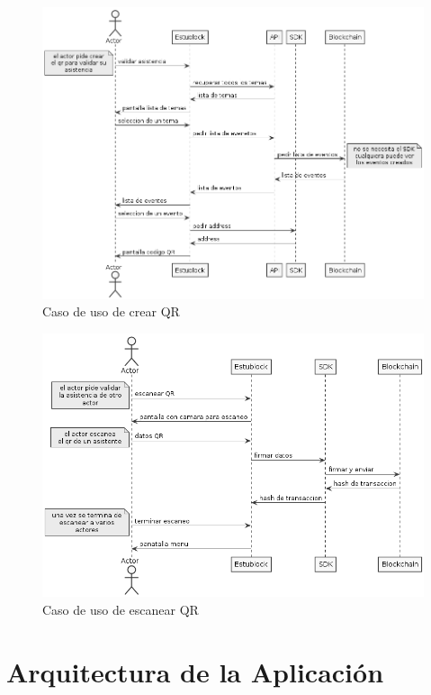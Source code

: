 \begin{figure}[h!]
  \centering
  \includegraphics[width=1\linewidth]{figs/Desarrollo/CasosUso/crearQR}
  \caption[Caso de uso de crear QR]{Caso de uso de crear QR}
  \label{fig:casoCrearQR}
\end{figure}

\begin{figure}[h!]
  \centering
  \includegraphics[width=1\linewidth]{figs/Desarrollo/CasosUso/escanearQR}
  \caption[Caso de uso de escanear QR]{Caso de uso de escanear QR}
  \label{fig:casoEscanearQR}
\end{figure}


\clearpage
\section{Arquitectura de la Aplicación}

